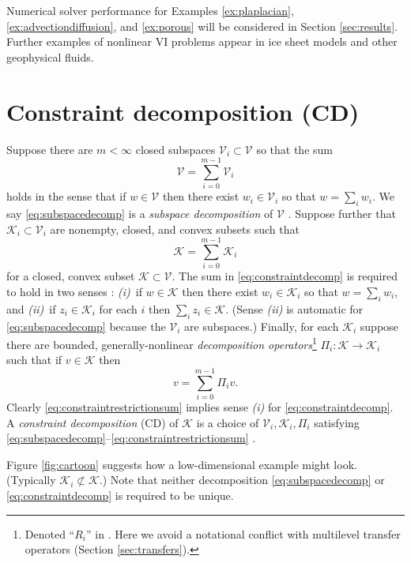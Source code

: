 \documentclass[letterpaper,final,12pt,reqno]{amsart}
\theoremstyle{cstyle}
\theoremstyle{cstyle*}
\theoremstyle{dstyle}
\numberwithin{equation}{section}
\numberwithin{figure}{section}
\numberwithin{table}{section}
\numberwithin{theorem}{section}
\newcommand{\cK}{\mathcal{K}}
\newcommand{\cV}{\mathcal{V}}
\begin{document}
Numerical solver performance for Examples \ref{ex:plaplacian}, \ref{ex:advectiondiffusion}, and \ref{ex:porous} will be considered in Section \ref{sec:results}.  Further examples of nonlinear VI problems appear in ice sheet models \cite{Calvoetal2002,JouvetBueler2012} and other geophysical fluids.


\section{Constraint decomposition (CD)} \label{sec:cd}

Suppose there are $m<\infty$ closed subspaces $\cV_i \subset \cV$ so that the sum
\begin{equation}
\cV = \sum_{i=0}^{m-1} \cV_i \label{eq:subspacedecomp}
\end{equation}
holds in the sense that if $w \in \cV$ then there exist $w_i \in \cV_i$ so that $w = \sum_i w_i$.  We say \eqref{eq:subspacedecomp} is a \emph{subspace decomposition} of $\cV$ \cite{Xu1992}.  Suppose further that $\cK_i \subset \cV_i$ are nonempty, closed, and convex subsets such that
\begin{equation}
\cK = \sum_{i=0}^{m-1} \cK_i \label{eq:constraintdecomp}
\end{equation}
for a closed, convex subset $\cK \subset \cV$.  The sum in \eqref{eq:constraintdecomp} is required to hold in two senses \cite{TaiTseng2002}: \emph{(i)}~if $w \in \cK$ then there exist $w_i \in \cK_i$ so that $w = \sum_i w_i$, and \emph{(ii)}~if $z_i \in \cK_i$ for each $i$ then $\sum_i z_i \in \cK$.  (Sense \emph{(ii)} is automatic for \eqref{eq:subspacedecomp} because the $\cV_i$ are subspaces.)  Finally, for each $\cK_i$ suppose there are bounded, generally-nonlinear \emph{decomposition operators}\footnote{Denoted ``$R_i$'' in \cite{Tai2003}.  Here we avoid a notational conflict with multilevel transfer operators (Section \ref{sec:transfers}).} $\Pi_i : \cK \to \cK_i$ such that if $v \in \cK$ then
\begin{equation}
v = \sum_{i=0}^{m-1} \Pi_i v.  \label{eq:constraintrestrictionsum}
\end{equation}
Clearly \eqref{eq:constraintrestrictionsum} implies sense \emph{(i)} for \eqref{eq:constraintdecomp}. A \emph{constraint decomposition} (CD) of $\cK$ is a choice of $\cV_i,\cK_i,\Pi_i$ satisfying \eqref{eq:subspacedecomp}--\eqref{eq:constraintrestrictionsum} \cite{Tai2003}.

Figure \ref{fig:cartoon} suggests how a low-dimensional example might look.  (Typically $\cK_i \not\subset \cK$.)  Note that neither decomposition \eqref{eq:subspacedecomp} or \eqref{eq:constraintdecomp} is required to be unique.
\end{document}
